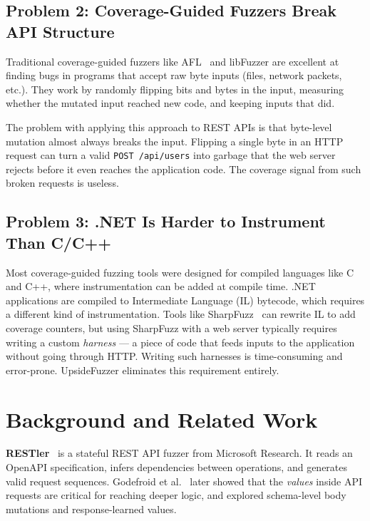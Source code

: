 \documentclass[conference]{IEEEtran}
\begin{document}
\subsection{Problem 2: Coverage-Guided Fuzzers Break API Structure}

Traditional coverage-guided fuzzers like AFL~\cite{afl} and libFuzzer are excellent at finding bugs in programs that accept raw byte inputs (files, network packets, etc.). They work by randomly flipping bits and bytes in the input, measuring whether the mutated input reached new code, and keeping inputs that did.

The problem with applying this approach to REST APIs is that byte-level mutation almost always breaks the input. Flipping a single byte in an HTTP request can turn a valid \texttt{POST /api/users} into garbage that the web server rejects before it even reaches the application code. The coverage signal from such broken requests is useless.

\subsection{Problem 3: .NET Is Harder to Instrument Than C/C++}

Most coverage-guided fuzzing tools were designed for compiled languages like C and C++, where instrumentation can be added at compile time. .NET applications are compiled to Intermediate Language (IL) bytecode, which requires a different kind of instrumentation. Tools like SharpFuzz~\cite{sharpfuzz} can rewrite IL to add coverage counters, but using SharpFuzz with a web server typically requires writing a custom \emph{harness} --- a piece of code that feeds inputs to the application without going through HTTP. Writing such harnesses is time-consuming and error-prone. UpsideFuzzer eliminates this requirement entirely.

\section{Background and Related Work}
\label{sec:background}

\textbf{RESTler}~\cite{restler_icse19} is a stateful REST API fuzzer from Microsoft Research. It reads an OpenAPI specification, infers dependencies between operations, and generates valid request sequences. Godefroid et al.~\cite{restler_fse20} later showed that the \emph{values} inside API requests are critical for reaching deeper logic, and explored schema-level body mutations and response-learned values.
\end{document}
